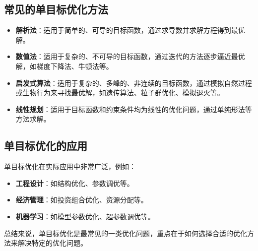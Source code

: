 \documentclass{article}
\begin{document}
\subsection*{常见的单目标优化方法}

\begin{itemize}
    \item \textbf{解析法}：适用于简单的、可导的目标函数，通过求导数并求解方程得到最优解。
    \item \textbf{数值法}：适用于复杂的、不可导的目标函数，通过迭代的方法逐步逼近最优解，如梯度下降法、牛顿法等。
    \item \textbf{启发式算法}：适用于复杂的、多峰的、非连续的目标函数，通过模拟自然过程或生物行为来寻找最优解，如遗传算法、粒子群优化、模拟退火等。
    \item \textbf{线性规划}：适用于目标函数和约束条件均为线性的优化问题，通过单纯形法等方法求解。
\end{itemize}

\subsection*{单目标优化的应用}

单目标优化在实际应用中非常广泛，例如：

\begin{itemize}
    \item \textbf{工程设计}：如结构优化、参数调优等。
    \item \textbf{经济管理}：如投资组合优化、资源分配等。
    \item \textbf{机器学习}：如模型参数优化、超参数调优等。
\end{itemize}

总结来说，单目标优化是最常见的一类优化问题，重点在于如何选择合适的优化方法来解决特定的优化问题。
\end{document}

